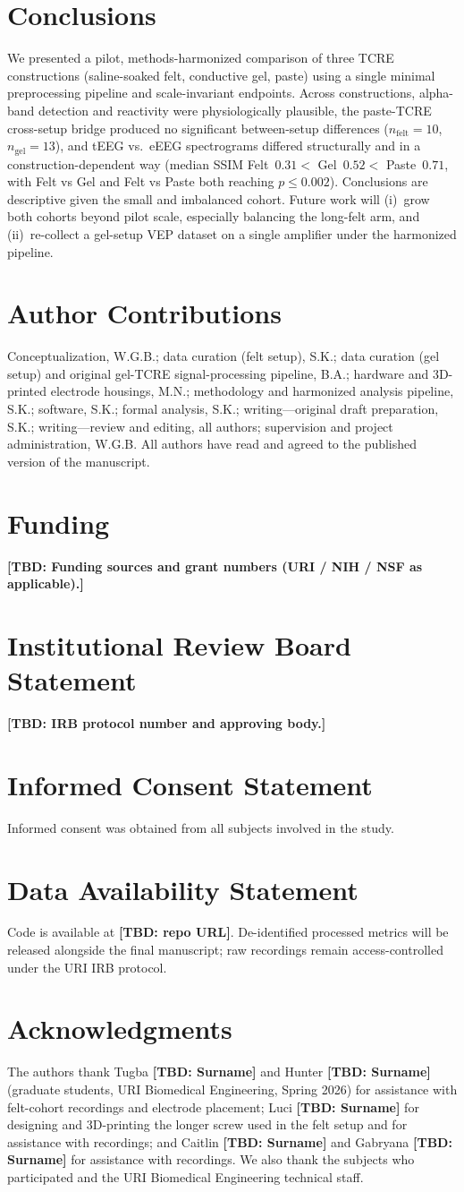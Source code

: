 \documentclass[10pt,a4paper]{article}
\newcommand{\authorcontributions}[1]{\section*{Author Contributions}#1}
\newcommand{\funding}[1]{\section*{Funding}#1}
\newcommand{\institutionalreview}[1]{\section*{Institutional Review Board Statement}#1}
\newcommand{\informedconsent}[1]{\section*{Informed Consent Statement}#1}
\newcommand{\dataavailability}[1]{\section*{Data Availability Statement}#1}
\newcommand{\acknowledgments}[1]{\section*{Acknowledgments}#1}
\newcommand{\TBD}[1]{{\color{red}\textbf{[TBD: #1]}}}
\begin{document}
\section{Conclusions}

We presented a pilot, methods-harmonized comparison of three TCRE constructions (saline-soaked felt, conductive gel, paste) using a single minimal preprocessing pipeline and scale-invariant endpoints. Across constructions, alpha-band detection and reactivity were physiologically plausible, the paste-TCRE cross-setup bridge produced no significant between-setup differences ($n_{\mathrm{felt}}=10$, $n_{\mathrm{gel}}=13$), and tEEG vs.\ eEEG spectrograms differed structurally and in a construction-dependent way (median SSIM Felt~$0.31 < $ Gel~$0.52 < $ Paste~$0.71$, with Felt vs Gel and Felt vs Paste both reaching $p\leq 0.002$). Conclusions are descriptive given the small and imbalanced cohort. Future work will (i)~grow both cohorts beyond pilot scale, especially balancing the long-felt arm, and (ii)~re-collect a gel-setup VEP dataset on a single amplifier under the harmonized pipeline.

\vspace{6pt}

\authorcontributions{Conceptualization, W.G.B.; data curation (felt setup), S.K.; data curation (gel setup) and original gel-TCRE signal-processing pipeline, B.A.; hardware and 3D-printed electrode housings, M.N.; methodology and harmonized analysis pipeline, S.K.; software, S.K.; formal analysis, S.K.; writing---original draft preparation, S.K.; writing---review and editing, all authors; supervision and project administration, W.G.B. All authors have read and agreed to the published version of the manuscript.}

\funding{\TBD{Funding sources and grant numbers (URI / NIH / NSF as applicable).}}

\institutionalreview{\TBD{IRB protocol number and approving body.}}

\informedconsent{Informed consent was obtained from all subjects involved in the study.}

\dataavailability{Code is available at \TBD{repo URL}. De-identified processed metrics will be released alongside the final manuscript; raw recordings remain access-controlled under the URI IRB protocol.}

\acknowledgments{The authors thank Tugba \TBD{Surname} and Hunter \TBD{Surname} (graduate students, URI Biomedical Engineering, Spring 2026) for assistance with felt-cohort recordings and electrode placement; Luci \TBD{Surname} for designing and 3D-printing the longer screw used in the felt setup and for assistance with recordings; and Caitlin \TBD{Surname} and Gabryana \TBD{Surname} for assistance with recordings. We also thank the subjects who participated and the URI Biomedical Engineering technical staff.}
\end{document}
